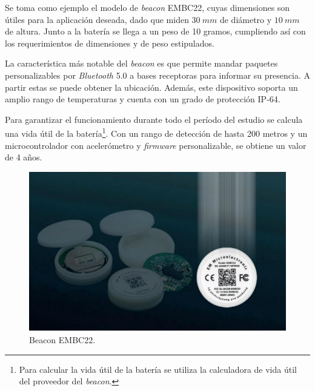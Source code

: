 Se toma como ejemplo el modelo de \textit{beacon} EMBC22, cuyas dimensiones son útiles para la aplicación deseada, dado que miden $30 \ mm$ de diámetro y $10 \ mm$ de altura. Junto a la batería se llega a un peso de 10 gramos, cumpliendo así con los requerimientos de dimensiones y de peso estipulados.

La característica más notable del \textit{beacon} es que permite mandar paquetes personalizables por \textit{Bluetooth} 5.0 a bases receptoras para informar su presencia. A partir estas se puede obtener la ubicación. Además, este dispositivo soporta un amplio rango de temperaturas y cuenta con un grado de protección IP-64.

Para garantizar el funcionamiento durante todo el período del estudio se calcula una vida útil de la batería\footnote{Para calcular la vida útil de la batería se utiliza la calculadora de vida útil del proveedor del \textit{beacon}.}. Con un rango de detección de hasta 200 metros y un microcontrolador con acelerómetro y \textit{firmware} personalizable, se obtiene un valor de 4 años.
\begin{figure}[H]
	\centering
	\includegraphics[width=0.7\linewidth]{ImagenesFactibilidad/beaconpic}
	\caption{Beacon EMBC22.}
	\label{fig:beacon}
\end{figure}

